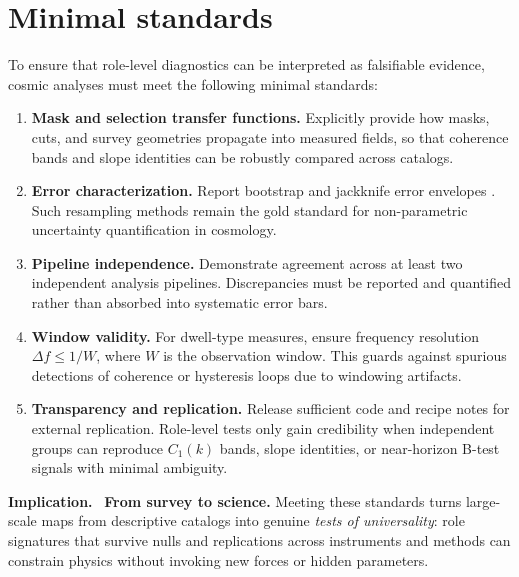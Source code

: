 \documentclass[12pt,a4paper,oneside]{scrreprt}
\newenvironment{implication}{\par\vspace{0.5em}\noindent\textbf{Implication.}\ }{\par\vspace{0.5em}}
\begin{document}
\section{Minimal standards}\label{sec:cosmos-standards}

To ensure that role-level diagnostics can be interpreted as 
falsifiable evidence, cosmic analyses must meet the following 
minimal standards:

\begin{enumerate}[label=(\roman*)]
  \item \textbf{Mask and selection transfer functions.} 
  Explicitly provide how masks, cuts, and survey geometries 
  propagate into measured fields, so that coherence bands 
  and slope identities can be robustly compared across catalogs.
  
  \item \textbf{Error characterization.} 
  Report bootstrap and jackknife error envelopes 
  \citep{Efron1993Bootstrap}. 
  Such resampling methods remain the gold standard for 
  non-parametric uncertainty quantification in cosmology.
  
  \item \textbf{Pipeline independence.} 
  Demonstrate agreement across at least two independent 
  analysis pipelines. 
  Discrepancies must be reported and quantified rather than 
  absorbed into systematic error bars.
  
  \item \textbf{Window validity.} 
  For dwell-type measures, ensure frequency resolution 
  $\Delta f \leq 1/W$, where $W$ is the observation window. 
  This guards against spurious detections of coherence 
  or hysteresis loops due to windowing artifacts.
  
  \item \textbf{Transparency and replication.} 
  Release sufficient code and recipe notes for external replication. 
  Role-level tests only gain credibility when independent groups 
  can reproduce $C_1(k)$ bands, slope identities, or near-horizon 
  B-test signals with minimal ambiguity.
\end{enumerate}

\begin{implication}
\textbf{From survey to science.} 
Meeting these standards turns large-scale maps from 
descriptive catalogs into genuine \emph{tests of universality}: 
role signatures that survive nulls and replications across 
instruments and methods can constrain physics without invoking 
new forces or hidden parameters.
\end{implication}
\end{document}
